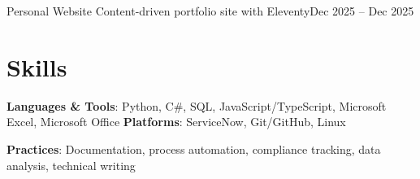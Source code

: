 \documentclass[letterpaper,10pt]{article}
\begin{document}
    \resumeSubheading
      {Personal Website}{}
      {Content-driven portfolio site with Eleventy}{Dec 2025 -- Dec 2025}
      \resumeItemListStart
      \resumeItemListEnd

  \resumeSubHeadingListEnd


\section{Skills}
 \resumeSubHeadingListStart
   \item{
     \textbf{Languages \& Tools}{: Python, C\#, SQL, JavaScript/TypeScript, Microsoft Excel, Microsoft Office}
     \hfill
     \textbf{Platforms}{: ServiceNow, Git/GitHub, Linux}
   }
   \item{
     \textbf{Practices}{: Documentation, process automation, compliance tracking, data analysis, technical writing}
   }
 \resumeSubHeadingListEnd

\end{document}
